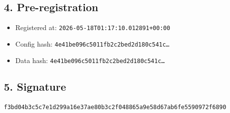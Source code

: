\documentclass{article}
\begin{document}
\subsection*{4. Pre-registration}
\begin{itemize}
\item Registered at: \texttt{2026-05-18T01:17:10.012891+00:00}
\item Config hash: \texttt{4e41be096c5011fb2c2bed2d180c541c\dots}
\item Data hash: \texttt{4e41be096c5011fb2c2bed2d180c541c\dots}
\end{itemize}
\subsection*{5. Signature}
\texttt{f3bd04b3c5c7e1d299a16e37ae80b3c2f048865a9e58d67ab6fe5590972f6890}\\
\end{document}
